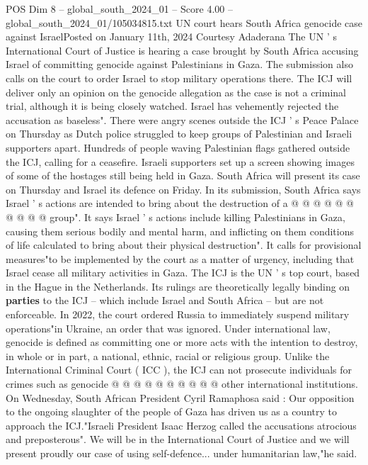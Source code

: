 \begin{textsample}{POS Dim 8 – global\_south\_2024\_01 – Score 4.00 – global\_south\_2024\_01/105034815.txt}  \label{ex:f8_pos_285}
UN court hears South Africa genocide case against IsraelPosted on January 11th, 2024 Courtesy Adaderana The UN ' s International Court of Justice is hearing a case brought by South Africa accusing Israel of committing genocide against Palestinians in Gaza.
The submission also calls on the court to order Israel to stop military operations there.
The ICJ will deliver only an opinion on the genocide allegation as the case is not a criminal trial, although it is being closely watched.
Israel has vehemently rejected the accusation as baseless".
There were angry scenes outside the ICJ ' s Peace Palace on Thursday as Dutch police struggled to keep groups of Palestinian and Israeli supporters apart.
Hundreds of people waving Palestinian flags gathered outside the ICJ, calling for a ceasefire.
Israeli supporters set up a screen showing images of some of the hostages still being held in Gaza.
South Africa will present its case on Thursday and Israel its defence on Friday.
In its submission, South Africa says Israel ' s actions are intended to bring about the destruction of a @ @ @ @ @ @ @ @ @ @ group".
It says Israel ' s actions include killing Palestinians in Gaza, causing them serious bodily and mental harm, and inflicting on them conditions of life calculated to bring about their physical destruction".
It calls for provisional measures"to be implemented by the court as a matter of urgency, including that Israel cease all military activities in Gaza.
The ICJ is the UN ' s top court, based in the Hague in the Netherlands.
Its rulings are theoretically legally binding on \textbf{parties} to the ICJ -- which include Israel and South Africa -- but are not enforceable.
In 2022, the court ordered Russia to immediately suspend military operations"in Ukraine, an order that was ignored.
Under international law, genocide is defined as committing one or more acts with the intention to destroy, in whole or in part, a national, ethnic, racial or religious group.
Unlike the International Criminal Court ( ICC ), the ICJ can not prosecute individuals for crimes such as genocide @ @ @ @ @ @ @ @ @ @ other international institutions.
On Wednesday, South African President Cyril Ramaphosa said : Our opposition to the ongoing slaughter of the people of Gaza has driven us as a country to approach the ICJ."Israeli President Isaac Herzog called the accusations atrocious and preposterous".
We will be in the International Court of Justice and we will present proudly our case of using self-defence... under humanitarian law,"he said.

\end{textsample}
